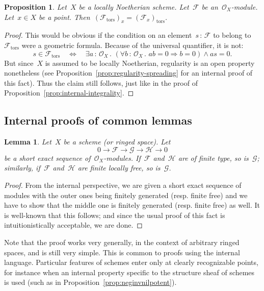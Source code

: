 \documentclass[10pt]{amsart}
\makeatletter
\theoremstyle{definition}
\theoremstyle{plain}
\newtheorem{prop}[defn]{Proposition}
\newtheorem{lemma}[defn]{Lemma}
\theoremstyle{remark}
\newcommand{\F}{\mathcal{F}}
\renewcommand{\G}{\mathcal{G}}
\renewcommand{\H}{\mathcal{H}}
\renewcommand{\O}{\mathcal{O}}
\newcommand{\tors}{\mathrm{tors}}
\newcommand{\?}{\,{:}\,}
\renewcommand{\_}{\mathpunct{.}\,}
\newcommand{\lra}{\longrightarrow}
\newcommand{\resp}{resp.\@\xspace}
\makeatother
\begin{document}
\begin{prop}\label{prop:torsion-submodule-stalks}
Let~$X$ be a locally Noetherian scheme. Let~$\F$ be
an~$\O_X$-module. Let~$x \in X$ be a point. Then~$(\F_\tors)_x =
(\F_x)_\tors$.\end{prop}
\begin{proof}This would be obvious if the condition on an element~$s\?\F$ to
belong to~$\F_\tors$ were a geometric formula. Because of the universal
quantifier, it is not:
\[ s \in \F_\tors \quad\Longleftrightarrow\quad
  \exists a\?\O_X\_ (\forall b\?\O_X\_ ab = 0 \Rightarrow b = 0) \wedge as = 0. \]
But since~$X$ is assumed to be locally Noetherian, regularity is an open
property nonetheless (see Proposition~\ref{prop:regularity-spreading} for an
internal proof of this fact). Thus the claim still follows, just like in the
proof of Proposition~\ref{prop:internal-integrality}.
\end{proof}


\subsection{Internal proofs of common lemmas}

\begin{lemma}Let~$X$ be a scheme (or ringed space). Let
\[ 0 \lra \F \lra \G \lra \H \lra 0 \]
be a short exact sequence of~$\O_X$-modules. If~$\F$ and~$\H$ are of finite
type, so is~$\G$; similarly, if~$\F$ and~$\H$ are finite locally free, so
is~$\G$.
\end{lemma}
\begin{proof}From the internal perspective, we are given a short exact sequence
of modules with the outer ones being finitely generated (\resp finite free)
and we have to show that the middle one is finitely generated (\resp finite
free) as well. It is well-known that this follows; and since the usual proof of
this fact is intuitionistically acceptable, we are done.
\end{proof}

Note that the proof works very generally, in the context of arbitrary ringed
spaces, and is still very simple. This is common to proofs using the internal
language. Particular features of schemes enter only at clearly recognizable
points, for instance when an internal property specific to the structure sheaf
of schemes is used (such as in Proposition~\ref{prop:neginvnilpotent}).
\end{document}
